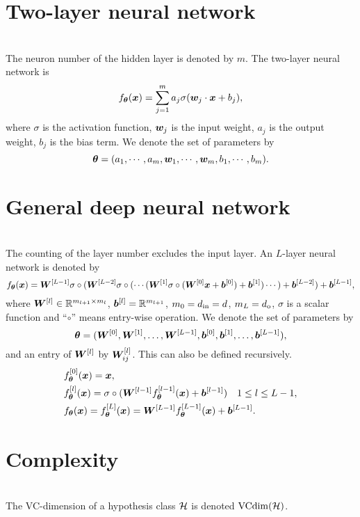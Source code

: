 \documentclass{article}
\begin{document}
\section{Two-layer neural network}~\\
The neuron number of the hidden layer is denoted by $m$. The two-layer neural network is
\begin{equation}
    f_{\bm{\theta}}(\bm{x})=\sum_{j=1}^{m} a_j \sigma (\bm{w}_j\cdot \bm{x} + b_j),
\end{equation}
where $\sigma$ is the activation function, $\bm{w}_j$ is the input weight, $a_j$ is the output weight, $b_j$ is the bias term. We denote the set of parameters by
\[
    \bm{\theta}=(a_1,\cdots,a_m,\bm{w}_1,\cdots,\bm{w}_m,b_1,\cdots,b_m).
\]
\section{General deep neural network}~\\
The counting of the layer number excludes the input layer. An $L$-layer neural network is denoted by
\begin{equation}
    f_{\bm{\theta}}(\bm{x}) = \bm{W}^{[L-1]} \sigma\circ(\bm{W}^{[L-2]}\sigma\circ(\cdots (\bm{W}^{[1]} \sigma\circ(\bm{W}^{[0]} \bm{x} + \bm{b}^{[0]} ) + \bm{b}^{[1]} )\cdots)+\bm{b}^{[L-2]})+\bm{b}^{[L-1]},
\end{equation}
where $\bm{W}^{[l]} \in \mathbb{R}^{m_{l+1}\times m_{l}}$, $\bm{b}^{[l]}=\mathbb{R}^{m_{l+1}}$, $m_0=d_{\rm in}=d$, $m_{L}=d_{\rm o}$,
$\sigma$ is a scalar function and ``$\circ$'' means entry-wise operation.
We denote the set of parameters by \[
    \bm{\theta}=(\bm{W}^{[0]},\bm{W}^{[1]},\ldots,\bm{W}^{[L-1]},\bm{b}^{[0]},\bm{b}^{[1]},\ldots,\bm{b}^{[L-1]}),
\]
and  an entry of $\bm{W}^{[l]}$ by   $\bm{W}^{[l]}_{ij}$. This can also be defined recursively.
\begin{align}
     & f_{\bm{\theta}}^{[0]}(\bm{x})=\bm{x},                                                                                   \\
     & f_{\bm{\theta}}^{[l]}(\bm{x})=\sigma\circ(\bm{W}^{[l-1]} f_{\bm{\theta}}^{[l-1]}(\bm{x}) + \bm{b}^{[l-1]}) \quad 1\leq l\leq L-1, \\
     & f_{\bm{\theta}}(\bm{x})=f_{\bm{\theta}}^{[L]}(\bm{x})=\bm{W}^{[L-1]} f_{\bm{\theta}}^{[L-1]}(\bm{x}) + \bm{b}^{[L-1]}.
\end{align}

\section{Complexity}~\\
The VC-dimension of a hypothesis class $\mathcal{H}$ is denoted ${\rm VCdim}(\mathcal{H})$.
\end{document}
